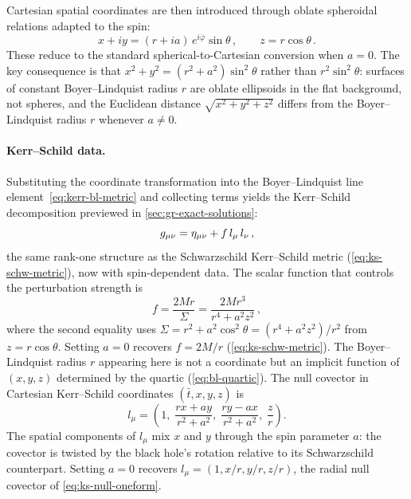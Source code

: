 Cartesian spatial coordinates are then introduced through oblate
spheroidal relations adapted to the spin:
%
\begin{equation}
  x + iy = (r + ia)\,e^{i\bar{\varphi}}\sin\theta \,,
  \qquad z = r\cos\theta \,.
  \label{eq:kerr-oblate-spheroidal}
\end{equation}
%
These reduce to the standard spherical-to-Cartesian conversion when
$a = 0$.  The key consequence is that
$x^2 + y^2 = (r^2 + a^2)\sin^2\!\theta$ rather than
$r^2\sin^2\!\theta$: surfaces of constant Boyer--Lindquist radius $r$
are oblate ellipsoids in the flat background, not spheres, and the
Euclidean distance $\sqrt{x^2+y^2+z^2}$ differs from the
Boyer--Lindquist radius $r$ whenever $a \neq 0$.

\paragraph{Kerr--Schild data.}

Substituting the coordinate transformation into the Boyer--Lindquist
line element~\eqref{eq:kerr-bl-metric} and collecting terms yields the
Kerr--Schild decomposition previewed in
\cref{sec:gr-exact-solutions}:
%
\begin{equation}
  g_{\mu\nu} = \eta_{\mu\nu} + f\,l_\mu\,l_\nu \,,
  \label{eq:kerr-ks-metric}
\end{equation}
%
the same rank-one structure as the Schwarzschild Kerr--Schild metric
(\cref{eq:ks-schw-metric}), now with spin-dependent data.  The scalar
function that controls the perturbation strength is
%
\begin{equation}
  f = \frac{2Mr}{\Sigma}
    = \frac{2Mr^3}{r^4 + a^2 z^2} \,,
  \label{eq:kerr-ks-f}
\end{equation}
%
where the second equality uses
$\Sigma = r^2 + a^2\cos^2\!\theta = (r^4 + a^2 z^2)/r^2$ from
$z = r\cos\theta$.  Setting $a = 0$ recovers $f = 2M/r$
(\cref{eq:ks-schw-metric}).  The Boyer--Lindquist radius $r$ appearing
here is not a coordinate but an implicit function of $(x, y, z)$
determined by the quartic (\cref{eq:bl-quartic}).  The null covector
in Cartesian Kerr--Schild coordinates $(\bar{t}, x, y, z)$ is
%
\begin{equation}
  l_\mu = \left(1,\;
    \frac{rx + ay}{r^2 + a^2},\;
    \frac{ry - ax}{r^2 + a^2},\;
    \frac{z}{r}\right) .
  \label{eq:kerr-ks-null}
\end{equation}
%
The spatial components of $l_\mu$ mix $x$ and $y$ through the spin
parameter $a$: the covector is twisted by the black hole's rotation
relative to its Schwarzschild counterpart.  Setting $a = 0$ recovers
$l_\mu = (1, x/r, y/r, z/r)$, the radial null covector of
\cref{eq:ks-null-oneform}.

